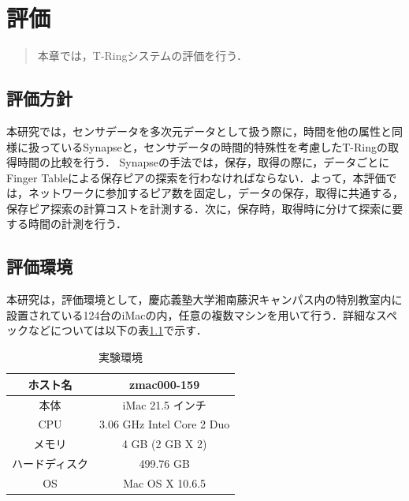 \chapter{評価}
\begin{large}
\begin{quote}
本章では，T-Ringシステムの評価を行う．
\end{quote}
\end{large}
\clearpage

\section{評価方針}
本研究では，センサデータを多次元データとして扱う際に，時間を他の属性と同様に扱っているSynapseと，センサデータの時間的特殊性を考慮したT-Ringの取得時間の比較を行う．
Synapseの手法では，保存，取得の際に，データごとにFinger Tableによる保存ピアの探索を行わなければならない．よって，本評価では，ネットワークに参加するピア数を固定し，データの保存，取得に共通する，保存ピア探索の計算コストを計測する．次に，保存時，取得時に分けて探索に要する時間の計測を行う．

\section{評価環境}
本研究は，評価環境として，慶応義塾大学湘南藤沢キャンパス内の特別教室内に設置されている124台のiMacの内，任意の複数マシンを用いて行う．詳細なスペックなどについては以下の表\ref{tab:information}で示す．

\begin{table}[htb]
  \centering
  \caption{実験環境}
  \begin{tabular}{|c||c|} \hline
  	ホスト名	 & zmac000-159 \\ \hline
	本体 & iMac 21.5 インチ \\ \hline
	CPU	& 3.06 GHz Intel Core 2 Duo \\ \hline
	メモリ & 4 GB (2 GB X 2) \\ \hline
	ハードディスク	& 499.76 GB \\ \hline
	OS & Mac OS X 10.6.5 \\ \hline
  \end{tabular}
  \label{tab:information}
\end{table}
